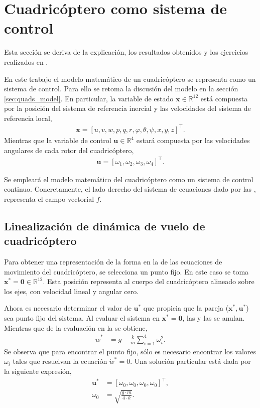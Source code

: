 \section{Cuadricóptero como sistema de control}
\label{sec:quadcoper_control_system}
Esta sección se deriva de la explicación, los resultados obtenidos y los ejercicios realizados en \cite{capella2020clase}. 

En este trabajo el modelo matemático de un cuadricóptero se representa como un sistema de control. Para ello se retoma la discusión del modelo en la sección \ref{sec:quads_model}. En particular, la variable de estado $\mathbf{x} \in \mathbb{R}^{12}$ está compuesta por la posición del sistema de referencia inercial y las velocidades del sistema de referencia local,
\begin{align}
\label{eq:quad_position}
\mathbf{x} = [u, v, w, p, q, r, \varphi, \theta, \psi, x, y, z]^{\top}.
\end{align}
Mientras que la variable de control $\mathbf{u} \in \mathbb{R}^{4}$ estará compuesta por las velocidades angulares de cada rotor del cuadricóptero,
\begin{align}
    \mathbf{u} = [\omega_1, \omega_2, \omega_3, \omega_4]^{\top}.
\end{align}

Se empleará el modelo matemático del cuadricóptero como un sistema de control continuo. Concretamente, el lado derecho del sistema de ecuaciones dado por las  , representa el campo vectorial $f$.

\subsection{Linealización de dinámica de vuelo de cuadricóptero}
Para obtener una representación de la forma en la  de las ecuaciones de movimiento del cuadricóptero, se selecciona un punto fijo. En este caso se toma $\mathbf{x}^{*} = 
\mathbf{0} \in \mathbb{R}^{12}$. Esta posición representa al cuerpo del cuadricóptero alineado sobre los ejes, con velocidad lineal y angular cero. 

Ahora es necesario determinar el valor de $\mathbf{u}^{*}$ que propicia que la pareja ($\mathbf{x}^{*}, \mathbf{u}^{*}$) sea punto fijo del sistema. Al evaluar el sistema en $\mathbf{x}^{*} = 
\mathbf{0}$, las  y las  se anulan. Mientras que de la evaluación en la  se obtiene, 
\begin{align}
    \dot{w}^{*} & = g - \frac{k}{m}\sum_{i=1}^{4}\omega_i^{2}.
\end{align}
Se observa que para encontrar el punto fijo, sólo es necesario encontrar los valores $\omega_i$ tales que resuelvan la ecuación $\dot{w}^{*}=0$. Una solución particular está dada por la siguiente expresión, 
\begin{align}
    \mathbf{u}^{*} &= \left[\omega_0, \omega_0, \omega_0, \omega_0\right]^{\top},\\
    \omega_0 &= \sqrt{\frac{g\cdot m}{4 \cdot k}}.
\end{align}

